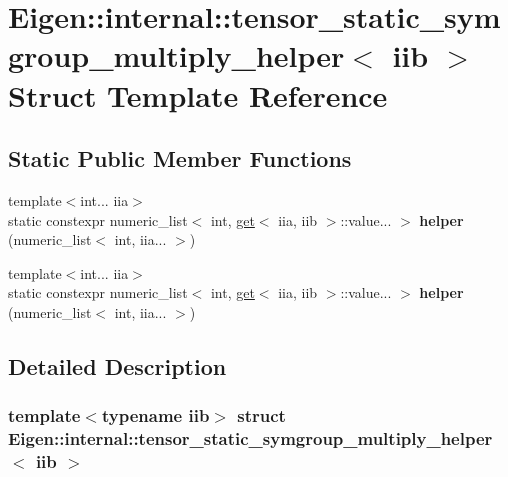 \hypertarget{struct_eigen_1_1internal_1_1tensor__static__symgroup__multiply__helper}{}\section{Eigen\+:\+:internal\+:\+:tensor\+\_\+static\+\_\+symgroup\+\_\+multiply\+\_\+helper$<$ iib $>$ Struct Template Reference}
\label{struct_eigen_1_1internal_1_1tensor__static__symgroup__multiply__helper}
\subsection*{Static Public Member Functions}
\begin{DoxyCompactItemize}
\item 
\mbox{\label{struct_eigen_1_1internal_1_1tensor__static__symgroup__multiply__helper_a51c790a67e193a63e460e9d802f2bb16}} 
{\footnotesize template$<$int... iia$>$ }\\static constexpr numeric\+\_\+list$<$ int, \hyperlink{struct_eigen_1_1internal_1_1get}{get}$<$ iia, iib $>$\+::value... $>$ {\bfseries helper} (numeric\+\_\+list$<$ int, iia... $>$)
\item 
\mbox{\label{struct_eigen_1_1internal_1_1tensor__static__symgroup__multiply__helper_a51c790a67e193a63e460e9d802f2bb16}} 
{\footnotesize template$<$int... iia$>$ }\\static constexpr numeric\+\_\+list$<$ int, \hyperlink{struct_eigen_1_1internal_1_1get}{get}$<$ iia, iib $>$\+::value... $>$ {\bfseries helper} (numeric\+\_\+list$<$ int, iia... $>$)
\end{DoxyCompactItemize}


\subsection{Detailed Description}
\subsubsection*{template$<$typename iib$>$\newline
struct Eigen\+::internal\+::tensor\+\_\+static\+\_\+symgroup\+\_\+multiply\+\_\+helper$<$ iib $>$}




